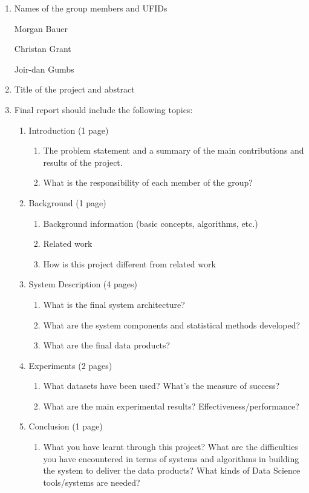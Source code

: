 \documentclass{article}
\begin{document}
\begin{enumerate}
\item Names of the group members and UFIDs


Morgan Bauer

Christan Grant

Joir-dan Gumbs

\item Title of the project and abstract
\item Final report should include the following topics:
  \begin{enumerate}

  \item  Introduction (1 page)
    \begin{enumerate}
    \item The problem statement and a summary of the main contributions and results of the project.
    \item What is the responsibility of each member of the group?
    \end{enumerate}

  \item Background (1 page)
    \begin{enumerate}\item
      Background information (basic concepts, algorithms, etc.)
    \item Related work
    \item How is this project different from related work
    \end{enumerate}

  \item System Description (4 pages)
    \begin{enumerate}
    \item What is the final system architecture?
    \item What are the system components and statistical methods developed?
    \item What are the final data products?
    \end{enumerate}

  \item Experiments (2 pages)
    \begin{enumerate}
    \item What datasets have been used? What’s the measure of success?
    \item What are the main experimental results? Effectiveness/performance?
    \end{enumerate}

  \item Conclusion (1 page)
    \begin{enumerate}\item What you have learnt through this project? What are the difficulties you have encountered in terms of systems and algorithms in building the system to deliver the data products? What kinds of Data Science tools/systems are needed?
    \end{enumerate}

  \end{enumerate}

\end{enumerate}
\end{document}
